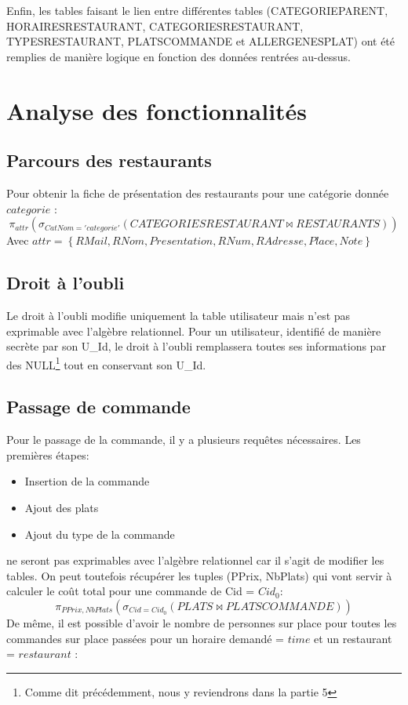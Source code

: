 \documentclass[10pt, a4paper]{article}
\begin{document}
Enfin, les tables faisant le lien entre différentes tables (CATEGORIEPARENT, HORAIRESRESTAURANT, CATEGORIESRESTAURANT, TYPESRESTAURANT, PLATSCOMMANDE et ALLERGENESPLAT) ont été remplies de manière logique en fonction des données rentrées au-dessus.

\section{Analyse des fonctionnalités}
\subsection{Parcours des restaurants}
Pour obtenir la fiche de présentation des restaurants pour une catégorie donnée $categorie$ :
$$
    \pi_{attr}(\sigma_{CatNom = 'categorie'}(CATEGORIESRESTAURANT \Join RESTAURANTS))
$$
Avec $attr = \left\{ RMail, RNom, Presentation, RNum, RAdresse, Place, Note \right\}$

\subsection{Droit à l'oubli}
Le droit à l'oubli modifie uniquement la table utilisateur mais n'est pas exprimable
avec l'algèbre relationnel. Pour un utilisateur, identifié de manière secrète par son U\_Id, le droit à l'oubli remplassera toutes ses informations par des NULL\footnote[1]{Comme dit précédemment, nous y reviendrons dans la partie 5} tout en conservant son U\_Id.

\subsection{Passage de commande}
Pour le passage de la commande, il y a plusieurs requêtes nécessaires.
Les premières étapes:
\begin{itemize}
    \item Insertion de la commande
    \item Ajout des plats
    \item Ajout du type de la commande
\end{itemize}
ne seront pas exprimables avec l'algèbre relationnel car il s'agit de modifier les tables.
On peut toutefois récupérer les tuples (PPrix, NbPlats) qui vont servir à calculer le coût total pour une commande de Cid = $Cid_0$:
$$
    \pi_{PPrix, NbPlats}( \sigma_{Cid = Cid_0}(PLATS \Join PLATSCOMMANDE))
$$
De même, il est possible d'avoir le nombre de personnes sur place pour toutes les commandes sur place passées pour un horaire demandé = $time$ et un restaurant = $restaurant$ :
\end{document}
